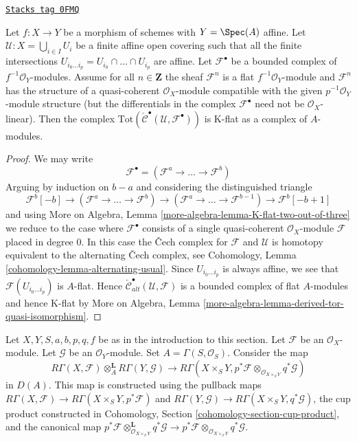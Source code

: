 \begin{lemma}[K flat]
\label{perfect-lemma-K-flat}
\href{https://stacks.math.columbia.edu/tag/0FMQ}{\texttt{Stacks tag 0FMQ}}

Let $f : X \to Y$ be a morphism of schemes with $Y = \Spec(A)$ affine.
Let $\mathcal{U} : X = \bigcup_{i \in I} U_i$ be a finite affine open covering
such that all the finite intersections
$U_{i_0 \ldots i_p} = U_{i_0} \cap \ldots \cap U_{i_p}$
are affine. Let $\mathcal{F}^\bullet$ be a bounded complex of
$f^{-1}\mathcal{O}_Y$-modules. Assume for all $n \in \mathbf{Z}$
the sheaf $\mathcal{F}^n$ is a flat $f^{-1}\mathcal{O}_Y$-module and
$\mathcal{F}^n$ has the structure of a quasi-coherent $\mathcal{O}_X$-module
compatible with the given $p^{-1}\mathcal{O}_Y$-module structure (but the
differentials in the complex $\mathcal{F}^\bullet$ need not
be $\mathcal{O}_X$-linear). Then the complex
$\text{Tot}(\check{\mathcal{C}}^\bullet(\mathcal{U}, \mathcal{F}^\bullet))$
is K-flat as a complex of $A$-modules.
\end{lemma}

\begin{proof}
We may write
$$
\mathcal{F}^\bullet = (\mathcal{F}^a \to \ldots \to \mathcal{F}^b)
$$
Arguing by induction on $b - a$ and considering the distinguished triangle
$$
\mathcal{F}^b[-b] \to (\mathcal{F}^a \to \ldots \to \mathcal{F}^b)
\to (\mathcal{F}^a \to \ldots \to \mathcal{F}^{b - 1}) \to
\mathcal{F}^b[-b + 1]
$$
and using
More on Algebra, Lemma \ref{more-algebra-lemma-K-flat-two-out-of-three}
we reduce to the case where $\mathcal{F}^\bullet$ consists of a
single quasi-coherent $\mathcal{O}_X$-module $\mathcal{F}$
placed in degree $0$. In this case the {\v C}ech complex
for $\mathcal{F}$ and $\mathcal{U}$ is homotopy equivalent to the
alternating {\v C}ech complex, see
Cohomology, Lemma \ref{cohomology-lemma-alternating-usual}.
Since $U_{i_0 \ldots i_p}$ is always affine, we see that
$\mathcal{F}(U_{i_0 \ldots i_p})$ is $A$-flat.
Hence
$\check{\mathcal{C}}_{alt}^\bullet(\mathcal{U}, \mathcal{F})$
is a bounded complex of flat $A$-modules and hence K-flat
by More on Algebra, Lemma
\ref{more-algebra-lemma-derived-tor-quasi-isomorphism}.
\end{proof}

Let $X, Y, S, a, b, p, q, f$ be as in the introduction to this section.
Let $\mathcal{F}$ be an $\mathcal{O}_X$-module.
Let $\mathcal{G}$ be an $\mathcal{O}_Y$-module.
Set $A = \Gamma(S, \mathcal{O}_S)$.
Consider the map
\begin{equation}
\label{equation-kunneth-single-sheaves}
R\Gamma(X, \mathcal{F})
\otimes_A^\mathbf{L}
R\Gamma(Y, \mathcal{G})
\longrightarrow
R\Gamma(X \times_S Y,
p^*\mathcal{F}
\otimes_{\mathcal{O}_{X \times_S Y}}
q^*\mathcal{G})
\end{equation}
in $D(A)$. This map is constructed using the pullback maps
$R\Gamma(X, \mathcal{F}) \to R\Gamma(X \times_S Y, p^*\mathcal{F})$ and
$R\Gamma(Y, \mathcal{G}) \to R\Gamma(X \times_S Y, q^*\mathcal{G})$,
the cup product constructed in
Cohomology, Section \ref{cohomology-section-cup-product}, and
the canonical map
$p^*\mathcal{F}
\otimes_{\mathcal{O}_{X \times_S Y}}^\mathbf{L}
q^*\mathcal{G}
\to
p^*\mathcal{F}
\otimes_{\mathcal{O}_{X \times_S Y}}
q^*\mathcal{G}$.

